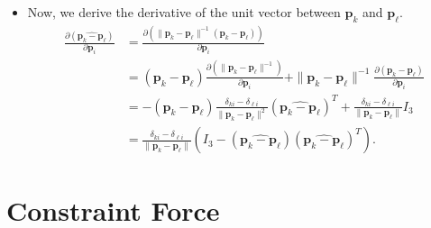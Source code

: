 \documentclass[10pt]{article}
\newcommand{\ve}[1]{\mathbf{#1}}
\begin{document}
\begin{itemize}
    \item Now, we derive the derivative of the unit vector between $\ve{p}_k$ and $\ve{p}_\ell$.
    \begin{align*}
      \frac{\partial (\widehat{\ve{p}_k-\ve{p}_\ell})}{\partial \ve{p}_i} 
      &= \frac{\partial (\| \ve{p}_k - \ve{p}_\ell \|^{-1}(\ve{p}_k-\ve{p}_\ell))}{\partial \ve{p}_i}\\
      &= (\ve{p}_k-\ve{p}_\ell) \frac{\partial (\| \ve{p}_k - \ve{p}_\ell \|^{-1})}{\partial \ve{p}_i}       
      +  \| \ve{p}_k - \ve{p}_\ell \|^{-1} \frac{\partial (\ve{p}_k-\ve{p}_\ell)}{\partial \ve{p}_i}\\
      &= -(\ve{p}_k-\ve{p}_\ell) \frac{\delta_{ki} - \delta_{\ell i}}{\| \ve{p}_k-\ve{p}_\ell \|^2} (\widehat{\ve{p}_k - \ve{p}_\ell})^T +
      \frac{\delta_{ki} - \delta_{\ell i}}{\| \ve{p}_k-\ve{p}_\ell \|} I_3 \\
      &= \frac{\delta_{ki} - \delta_{\ell i}}{\| \ve{p}_k-\ve{p}_\ell \|}(I_3 - (\widehat{\ve{p}_k - \ve{p}_\ell}) (\widehat{\ve{p}_k - \ve{p}_\ell})^T).
    \end{align*}

  \end{itemize}  

  \section{Constraint Force} %
  
\end{document}
